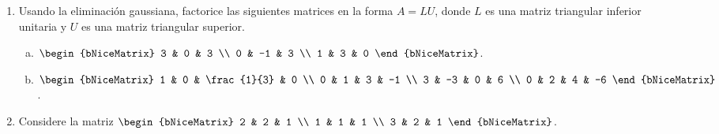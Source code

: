 \documentclass[
	spanish,
	8pt,
	utf8,
	xcolor=table,
	handout,
	aspectratio=169,
	professionalfonts,
	notheorems,
	mathserif,
]{beamer}
\begin{document}
\begin{frame}
	\begin{enumerate}
		\item

		      Usando la eliminación gaussiana, factorice las siguientes
		      matrices en la forma $A=LU$, donde $L$ es una matriz
		      triangular inferior unitaria y $U$ es una matriz triangular
		      superior.

		      \begin{multicols}{2}
			      \begin{enumerate}[a)]

				      \item

				            \begin{math}
					            \begin{bNiceMatrix}
						            3 & 0  & 3 \\
						            0 & -1 & 3
						            \\ 1 & 3 & 0
					            \end{bNiceMatrix}
				            \end{math}.

				      \item

				            \begin{math}
					            \begin{bNiceMatrix}
						            1 & 0  & \frac{1}{3} & 0  \\
						            0 & 1  & 3           & -1 \\
						            3 & -3 & 0           & 6  \\
						            0 & 2  & 4           & -6
					            \end{bNiceMatrix}
				            \end{math}.
			      \end{enumerate}
		      \end{multicols}
		\item

		      Considere la matriz
		      \begin{math}
			      \begin{bNiceMatrix}
				      2 & 2 & 1 \\
				      1 & 1 & 1 \\
				      3 & 2 & 1
			      \end{bNiceMatrix}
		      \end{math}.


\end{enumerate}
\end{frame}
\end{document}
